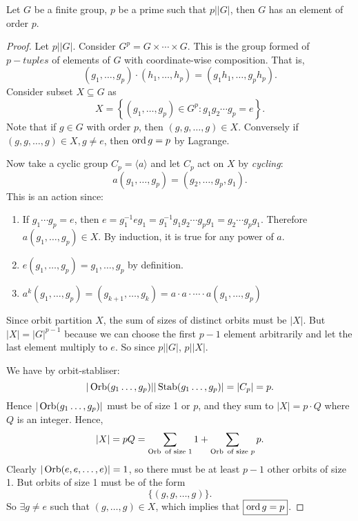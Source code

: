\documentclass[a4paper]{article}
\begin{document}
\begin{theorem}[Cauchy]\label{thm:Cauchy}
  Let $G$ be a finite group, $p$ be a prime such that $p||G|$, then
  $G$ has an element of order $p$.
\end{theorem}
\begin{proof}
  Let $p||G|$. Consider $ G^p = G\times \cdots \times G $. This is
  the group formed of $p-tuples$ of elements of $G$ with
  coordinate-wise composition. That is,
  \[
    (g_1,\dots,g_p)\cdot (h_1,\dots,h_p)=(g_1h_1,\dots,g_ph_p)
  .\]
  Consider subset $ X \subseteq G $ as
  \[
    X = \left\{ (g_1,\dots,g_p)\in G^p: g_1g_2\cdots g_p = e\right\}
  .\]
  Note that if $g\in G$ with order $p$, then $ (g,g,\dots,g)\in X $.
  Conversely if $ (g,g,\dots,g)\in X, g\neq e $, then $ \operatorname{ord} g=p $ by Lagrange.

  Now take a cyclic group $C_p=\langle a \rangle $ and let $C_p$ act
  on $X$ by \textit{cycling}:
  \[
    a(g_1,\dots,g_p)=(g_2,\dots, g_p,g_1)
  .\]
  This is an action since:
  \begin{enumerate}[(1)]
    \item If $ g_1\cdots g_p=e $, then $
      e=g_1^{-1}eg_1=g_1^{-1}g_1g_2\cdots g_p g_1=g_2\cdots g_pg_1 $.
      Therefore $ a(g_1,\dots,g_p) \in X$. By induction, it is true
      for any power of $a$.
    \item $ e(g_1,\dots,g_p)=g_1,\dots,g_p $ by definition.
    \item $ a^k(g_1,\dots,g_p)=(g_{k+1},\dots,g_k)=a\cdot a\cdot
      \cdots \cdot a(g_1,\dots,g_p) $
  \end{enumerate}
  Since orbit partition $X$, the sum of sizes of distinct orbits must
  be $|X|$. But $|X|=|G|^{p-1}$ because we can choose the first $p-1$
  element arbitrarily and let the last element multiply to $e$. So
  since $ p||G| $, $ p||X| $.

  We have by orbit-stabliser:
  \[
    |\operatorname{Orb}(g_1\dots,g_p)||\operatorname{Stab}(g_1\dots,g_p)|=|C_p|=p
  .\]
  Hence $|\operatorname{Orb}(g_1\dots,g_p)|$ must be of size 1 or $p$, and they sum
  to $|X|=p\cdot Q$ where $Q$ is an integer. Hence,
  \[
    |X|=pQ=\sum_{\operatorname{Orb} \text{ of size 1}} 1 + \sum_{\operatorname{Orb}\text{ of size }p} p
  .\]
  Clearly $ |\operatorname{Orb}(e,e,\dots,e)|=1 $, so there must be at least $p-1$
  other orbits of size 1. But orbits of size 1 must be of the form
  \[
    \{(g,g,\dots,g)\}
  .\]
  So $ \exists g\neq e $ such that $ (g,\dots,g) \in X$, which
  implies that $ \boxed{\operatorname{ord} g = p }$.
\end{proof}
\end{document}
